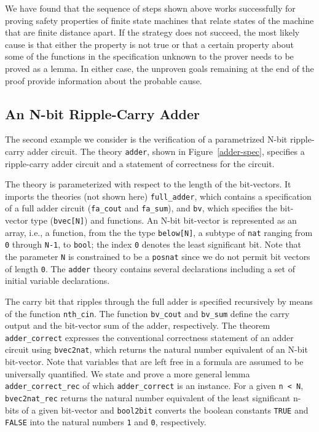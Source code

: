 \mbox{}

We have found that the sequence of steps shown above works successfully
for proving safety properties of finite state machines that relate
states of the machine that are finite distance apart.  If the strategy
does not succeed, the most likely cause is that either the
property is not true or that a certain property about some of the
functions in the specification unknown to the prover needs to be
proved as a lemma.  In either case, the unproven goals remaining at the
end of the proof provide information about the probable cause.


\subsection{An N-bit Ripple-Carry Adder}

The second example we consider is the verification of a parametrized
N-bit ripple-carry adder circuit.
The theory {\tt adder}, shown in Figure~\ref{adder-spec},
specifies a ripple-carry adder
circuit and a statement of correctness for the circuit.


The theory is parameterized with respect to the length of the bit-vectors.
It imports the theories (not shown here)
{\tt full\_adder}, which contains a
specification of a full adder circuit ({\tt fa\_cout} and {\tt fa\_sum}),
and {\tt bv}, which specifies
the bit-vector type ({\tt bvec[N]}) and functions.
An N-bit bit-vector is represented as an array, i.e., a function, from
the the type {\tt below[N]}, a subtype of {\tt nat} ranging from
{\tt 0} through {\tt N-1}, to {\tt bool}; the index {\tt 0} denotes the least
significant bit.
Note that the parameter {\tt N} is constrained to be a {\tt posnat} since
we do not permit bit vectors of length {\tt 0}.
The {\tt adder} theory contains several declarations including a set
of initial variable declarations.

The carry bit that ripples through the full adder is specified recursively
by means of the function {\tt nth\_cin}.
The function {\tt bv\_cout} and {\tt bv\_sum} define the carry output
and the bit-vector sum of the adder, respectively.
The theorem {\tt adder\_correct} expresses the conventional correctness
statement of an adder circuit using {\tt bvec2nat}, which returns the
natural number equivalent of an N-bit bit-vector.
Note that variables that are left free in a formula are assumed to be
universally quantified.
We state and prove a more general lemma {\tt adder\_correct\_rec} of which
{\tt adder\_correct} is an instance.
For a given {\tt n < N},
{\tt bvec2nat\_rec} returns the natural number equivalent of
the least significant n-bits of a given bit-vector and {\tt bool2bit}
converts the boolean constants {\tt TRUE} and {\tt FALSE} into the natural
numbers {\tt 1} and {\tt 0}, respectively.

